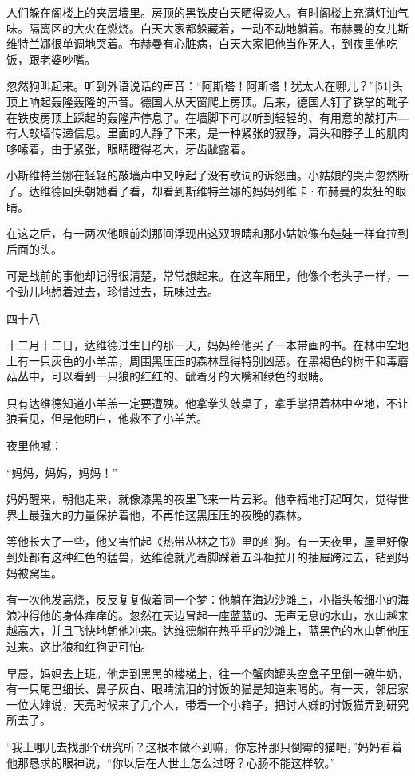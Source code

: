 人们躲在阁楼上的夹层墙里。房顶的黑铁皮白天晒得烫人。有时阁楼上充满灯油气味。隔离区的大火在燃烧。白天大家都躲藏着，一动不动地躺着。布赫曼的女儿斯维特兰娜很单调地哭着。布赫曼有心脏病，白天大家把他当作死人，到夜里他吃饭，跟老婆吵嘴。

忽然狗叫起来。听到外语说话的声音：“阿斯塔！阿斯塔！犹太人在哪儿？”[51]头顶上响起轰隆轰隆的声音。德国人从天窗爬上房顶。后来，德国人钉了铁掌的靴子在铁皮房顶上踩起的轰隆声停息了。在墙脚下可以听到轻轻的、有用意的敲打声—有人敲墙传递信息。里面的人静了下来，是一种紧张的寂静，肩头和脖子上的肌肉哆嗦着，由于紧张，眼睛瞪得老大，牙齿龇露着。

小斯维特兰娜在轻轻的敲墙声中又哼起了没有歌词的诉怨曲。小姑娘的哭声忽然断了。达维德回头朝她看了看，却看到斯维特兰娜的妈妈列维卡·布赫曼的发狂的眼睛。

在这之后，有一两次他眼前刹那间浮现出这双眼睛和那小姑娘像布娃娃一样耷拉到后面的头。

可是战前的事他却记得很清楚，常常想起来。在这车厢里，他像个老头子一样，一个劲儿地想着过去，珍惜过去，玩味过去。

四十八

十二月十二日，达维德过生日的那一天，妈妈给他买了一本带画的书。在林中空地上有一只灰色的小羊羔，周围黑压压的森林显得特别凶恶。在黑褐色的树干和毒蘑菇丛中，可以看到一只狼的红红的、龇着牙的大嘴和绿色的眼睛。

只有达维德知道小羊羔一定要遭殃。他拿拳头敲桌子，拿手掌捂着林中空地，不让狼看见，但是他明白，他救不了小羊羔。

夜里他喊：

“妈妈，妈妈，妈妈！”

妈妈醒来，朝他走来，就像漆黑的夜里飞来一片云彩。他幸福地打起呵欠，觉得世界上最强大的力量保护着他，不再怕这黑压压的夜晚的森林。

等他长大了一些，他又害怕起《热带丛林之书》里的红狗。有一天夜里，屋里好像到处都有这种红色的猛兽，达维德就光着脚踩着五斗柜拉开的抽屉跨过去，钻到妈妈被窝里。

有一次他发高烧，反反复复做着同一个梦：他躺在海边沙滩上，小指头般细小的海浪冲得他的身体痒痒的。忽然在天边冒起一座蓝蓝的、无声无息的水山，水山越来越高大，并且飞快地朝他冲来。达维德躺在热乎乎的沙滩上，蓝黑色的水山朝他压过来。这比狼和红狗更可怕。

早晨，妈妈去上班。他走到黑黑的楼梯上，往一个蟹肉罐头空盒子里倒一碗牛奶，有一只尾巴细长、鼻子灰白、眼睛流泪的讨饭的猫是知道来喝的。有一天，邻居家一位大婶说，天亮时候来了几个人，带着一个小箱子，把讨人嫌的讨饭猫弄到研究所去了。

“我上哪儿去找那个研究所？这根本做不到嘛，你忘掉那只倒霉的猫吧，”妈妈看着他那恳求的眼神说，“你以后在人世上怎么过呀？心肠不能这样软。”

